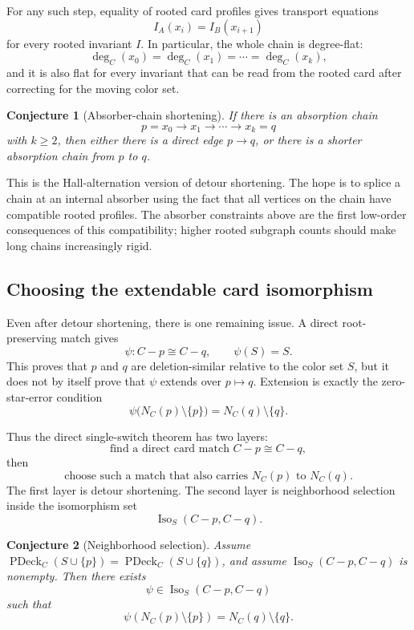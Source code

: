 \documentclass[11pt]{article}
\newtheorem{conjecture}{Conjecture}
\newcommand{\PDeck}{\operatorname{PDeck}}
\newcommand{\Iso}{\operatorname{Iso}}
\begin{document}
For any such step, equality of rooted card profiles gives transport equations
\[
  I_A(x_i)=I_B(x_{i+1})
\]
for every rooted invariant \(I\).  In particular, the whole chain is
degree-flat:
\[
  \deg_C(x_0)=\deg_C(x_1)=\cdots=\deg_C(x_k),
\]
and it is also flat for every invariant that can be read from the rooted card
after correcting for the moving color set.

\begin{conjecture}[Absorber-chain shortening]
If there is an absorption chain
\[
  p=x_0\to x_1\to\cdots\to x_k=q
\]
with \(k\geq 2\), then either there is a direct edge \(p\to q\), or there is a
shorter absorption chain from \(p\) to \(q\).
\end{conjecture}

This is the Hall-alternation version of detour shortening.  The hope is to
splice a chain at an internal absorber using the fact that all vertices on the
chain have compatible rooted profiles.  The absorber constraints above are
the first low-order consequences of this compatibility; higher rooted
subgraph counts should make long chains increasingly rigid.

\subsection{Choosing the extendable card isomorphism}

Even after detour shortening, there is one remaining issue.  A direct
root-preserving match gives
\[
  \psi:C-p\cong C-q,\qquad \psi(S)=S.
\]
This proves that \(p\) and \(q\) are deletion-similar relative to the color
set \(S\), but it does not by itself prove that \(\psi\) extends over
\(p\mapsto q\).  Extension is exactly the zero-star-error condition
\[
  \psi\bigl(N_C(p)\setminus\{p\}\bigr)=N_C(q)\setminus\{q\}.
\]

Thus the direct single-switch theorem has two layers:
\[
  \text{find a direct card match } C-p\cong C-q,
\]
then
\[
  \text{choose such a match that also carries }N_C(p)\text{ to }N_C(q).
\]
The first layer is detour shortening.  The second layer is neighborhood
selection inside the isomorphism set
\[
  \Iso_S(C-p,C-q).
\]

\begin{conjecture}[Neighborhood selection]
Assume \(\PDeck_C(S\cup\{p\})=\PDeck_C(S\cup\{q\})\), and assume
\(\Iso_S(C-p,C-q)\) is nonempty.  Then there exists
\[
  \psi\in\Iso_S(C-p,C-q)
\]
such that
\[
  \psi(N_C(p)\setminus\{p\})=N_C(q)\setminus\{q\}.
\]
\end{conjecture}
\end{document}
